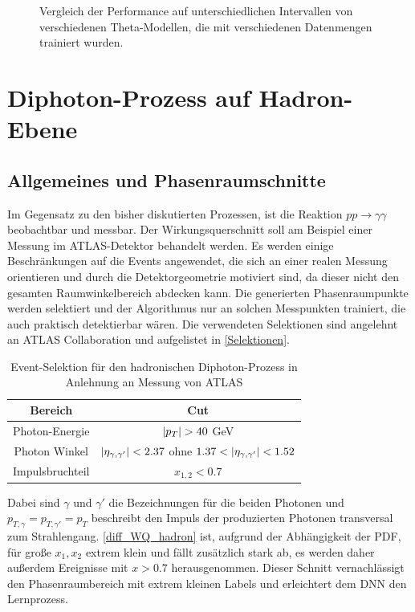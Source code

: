 \begin{figure}[h]
	\caption{Vergleich der Performance auf unterschiedlichen Intervallen von verschiedenen Theta-Modellen, die mit verschiedenen Datenmengen trainiert wurden.}
	\label{theta-comparison}
\end{figure}
\section{Diphoton-Prozess auf Hadron-Ebene}
\subsection{Allgemeines und Phasenraumschnitte}
Im Gegensatz zu den bisher diskutierten Prozessen, ist die Reaktion $pp \rightarrow \gamma \gamma$ beobachtbar und messbar. Der Wirkungsquerschnitt soll am Beispiel einer Messung im ATLAS-Detektor behandelt werden. Es werden einige Beschränkungen auf die Events angewendet, die sich an einer realen Messung orientieren und durch die Detektorgeometrie motiviert sind, da dieser nicht den gesamten Raumwinkelbereich abdecken kann. Die generierten Phasenraumpunkte werden selektiert und der Algorithmus nur an solchen Messpunkten trainiert, die auch praktisch detektierbar wären. Die verwendeten Selektionen sind angelehnt an ATLAS Collaboration\cite{Cuts-Paper} und aufgelistet in \textsf{\autoref{Selektionen}}.
\begin{table}[bp]
	\centering
	\begin{tabular}{|c|c|}
		\hline
		Bereich & Cut \\
		\hline
		Photon-Energie & $\abs{p_T} > 40$ GeV \\
		Photon Winkel & $\abs{\eta_{\gamma, \gamma'}} < 2.37$ ohne $1.37 < \abs{\eta_{\gamma, \gamma'}} < 1.52$ \\
		Impulsbruchteil & $x_{1,2} < 0.7 $\\
		\hline
	\end{tabular}
	\caption{Event-Selektion für den hadronischen Diphoton-Prozess in Anlehnung an Messung von ATLAS\cite{Cuts-Paper}}
	\label{Selektionen}
\end{table}
Dabei sind $\gamma$ und ${\gamma'}$ die Bezeichnungen für die beiden Photonen und $p_{T,\gamma} = p_{T,\gamma'} = p_T$ beschreibt den Impuls der produzierten Photonen transversal zum Strahlengang. \textsf{\autoref{diff_WQ_hadron}} ist, aufgrund der Abhängigkeit der PDF, für große $x_1, x_2$ extrem klein und fällt zusätzlich stark ab, es werden daher außerdem Ereignisse mit $x > 0.7$ herausgenommen. Dieser Schnitt vernachlässigt den Phasenraumbereich mit extrem kleinen Labels und erleichtert dem DNN den Lernprozess. 


